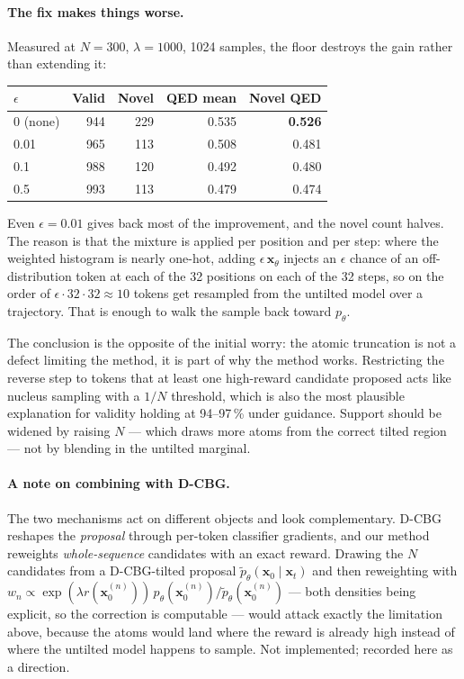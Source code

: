 \documentclass[11pt]{article}
\begin{document}
\paragraph{The fix makes things worse.}
Measured at $N = 300$, $\lambda = 1000$, 1024 samples, the floor destroys the
gain rather than extending it:

\begin{center}
\begin{tabular}{lrrrr}
\toprule
$\epsilon$ & Valid & Novel & QED mean & Novel QED \\
\midrule
0 (none) & 944 & 229 & 0.535 & \textbf{0.526} \\
0.01     & 965 & 113 & 0.508 & 0.481 \\
0.1      & 988 & 120 & 0.492 & 0.480 \\
0.5      & 993 & 113 & 0.479 & 0.474 \\
\bottomrule
\end{tabular}
\end{center}

Even $\epsilon = 0.01$ gives back most of the improvement, and the novel count
halves. The reason is that the mixture is applied per position and per step:
where the weighted histogram is nearly one-hot, adding $\epsilon\,
\mathbf{x}_\theta$ injects an $\epsilon$ chance of an off-distribution token at
each of the 32 positions on each of the 32 steps, so on the order of
$\epsilon \cdot 32 \cdot 32 \approx 10$ tokens get resampled from the untilted
model over a trajectory. That is enough to walk the sample back toward
$p_\theta$.

The conclusion is the opposite of the initial worry: the atomic truncation is
not a defect limiting the method, it is part of why the method works. Restricting
the reverse step to tokens that at least one high-reward candidate proposed acts
like nucleus sampling with a $1/N$ threshold, which is also the most plausible
explanation for validity holding at 94--97\,\% under guidance. Support should be
widened by raising $N$ --- which draws more atoms from the correct tilted region
--- not by blending in the untilted marginal.

\paragraph{A note on combining with D-CBG.}
The two mechanisms act on different objects and look complementary. D-CBG
reshapes the \emph{proposal} through per-token classifier gradients, and our
method reweights \emph{whole-sequence} candidates with an exact reward. Drawing
the $N$ candidates from a D-CBG-tilted proposal
$\tilde{p}_\theta(\mathbf{x}_0 \mid \mathbf{x}_t)$ and then reweighting with
$w_n \propto \exp(\lambda r(\mathbf{x}_0^{(n)}))\,
p_\theta(\mathbf{x}_0^{(n)})/\tilde{p}_\theta(\mathbf{x}_0^{(n)})$ --- both
densities being explicit, so the correction is computable --- would attack
exactly the limitation above, because the atoms would land where the reward is
already high instead of where the untilted model happens to sample. Not
implemented; recorded here as a direction.
\end{document}
